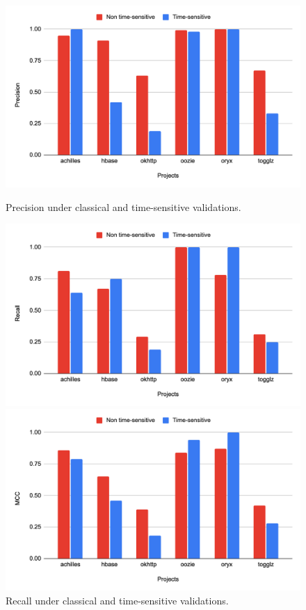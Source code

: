 \begin{figure}
  \centering
  \begin{minipage}[b]{0.4\textwidth}
    \includegraphics[width=\textwidth]{figures/replication/RQ1JavaPrecision.png}
    \caption{Precision under classical and time-sensitive validations.}
    \label{fig:prec-java}
  \end{minipage}
  \hfill
  \begin{minipage}[b]{0.4\textwidth}
    \includegraphics[width=\textwidth]{figures/replication/RQ1JavaRecall.png}
    \caption{Recall under classical and time-sensitive validations.}
    \label{fig:recall-java}
  \end{minipage}
  \hfill
  \begin{minipage}[b]{0.4\textwidth}
    \includegraphics[width=\textwidth]{figures/replication/RQ1JavaMcc.png}

\end{minipage}
\end{figure}
